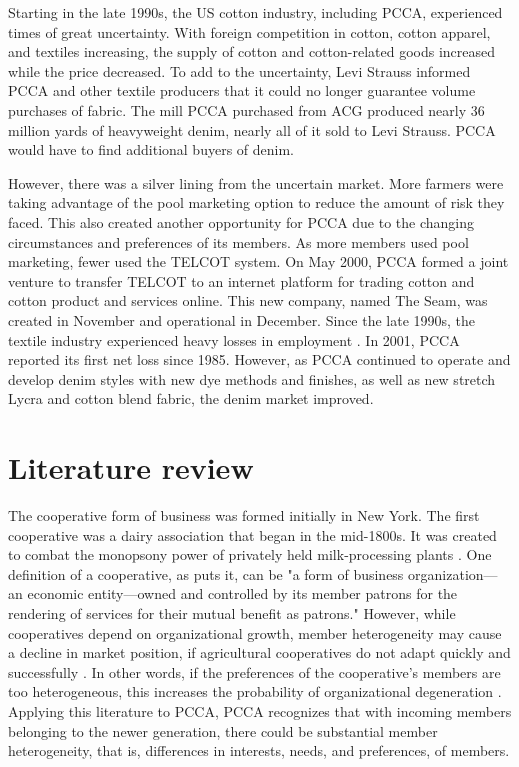 \documentclass[a4paper]{article}
\begin{document}
Starting in the late 1990s, the US cotton industry, including PCCA, experienced times of great uncertainty. With foreign competition in cotton, cotton apparel, and textiles increasing, the supply of cotton and cotton-related goods increased while the price decreased. To add to the uncertainty, Levi Strauss informed PCCA and other textile producers that it could no longer guarantee volume purchases of fabric. The mill PCCA purchased from ACG produced nearly 36 million yards of heavyweight denim, nearly all of it sold to Levi Strauss. PCCA would have to find additional buyers of denim. 

However, there was a silver lining from the uncertain market. More farmers were taking advantage of the pool marketing option to reduce the amount of risk they faced. This also created another opportunity for PCCA due to the changing circumstances and preferences of its members. As more members used pool marketing, fewer used the TELCOT system. On May 2000, PCCA formed a joint venture to transfer TELCOT to an internet platform for trading cotton and cotton product and services online. This new company, named The Seam, was created in November and operational in December. Since the late 1990s, the textile industry experienced heavy losses in employment \citep{nelsonhodgesEmploymentTextileApparel2006}. In 2001, PCCA reported its first net loss since 1985. However, as PCCA continued to operate and develop denim styles with new dye methods and finishes, as well as new stretch Lycra and cotton blend fabric, the denim market improved. 

\section{Literature review}

The cooperative form of business was formed initially in New York. The first cooperative was a dairy association that began in the mid-1800s. It was created to combat the monopsony power of privately held milk-processing plants \citep{porterEconomicEfficiencyCooperatives1987,erdmanRevolvingFinanceAgricultural1965}. One definition of a cooperative, as \citet{kollerCooperativesCapitalisticEconomy1947} puts it, can be "a form of business organization---an economic entity---owned and controlled by its member patrons for the rendering of services for their mutual benefit as patrons." However, while cooperatives depend on organizational growth, member heterogeneity may cause a decline in market position, if agricultural cooperatives do not adapt quickly and successfully \citep{cookCooperativeLifeCycle2009}. In other words, if the preferences of the cooperative's members are too heterogeneous, this increases the probability of organizational degeneration \citep{hansmannOwnershipEnterprise2000,chaddadUnderstandingNewCooperative2004,iliopoulosInfluenceCostsAgribusiness2009}. Applying this literature to PCCA, PCCA recognizes that with incoming members belonging to the newer generation, there could be substantial member heterogeneity, that is, differences in interests, needs, and preferences, of members. 
\end{document}
